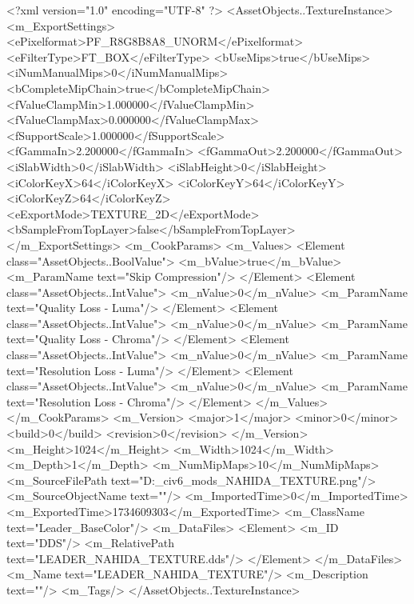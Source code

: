 <?xml version="1.0" encoding="UTF-8" ?>
<AssetObjects..TextureInstance>
	<m_ExportSettings>
		<ePixelformat>PF_R8G8B8A8_UNORM</ePixelformat>
		<eFilterType>FT_BOX</eFilterType>
		<bUseMips>true</bUseMips>
		<iNumManualMips>0</iNumManualMips>
		<bCompleteMipChain>true</bCompleteMipChain>
		<fValueClampMin>1.000000</fValueClampMin>
		<fValueClampMax>0.000000</fValueClampMax>
		<fSupportScale>1.000000</fSupportScale>
		<fGammaIn>2.200000</fGammaIn>
		<fGammaOut>2.200000</fGammaOut>
		<iSlabWidth>0</iSlabWidth>
		<iSlabHeight>0</iSlabHeight>
		<iColorKeyX>64</iColorKeyX>
		<iColorKeyY>64</iColorKeyY>
		<iColorKeyZ>64</iColorKeyZ>
		<eExportMode>TEXTURE_2D</eExportMode>
		<bSampleFromTopLayer>false</bSampleFromTopLayer>
	</m_ExportSettings>
	<m_CookParams>
		<m_Values>
			<Element class="AssetObjects..BoolValue">
				<m_bValue>true</m_bValue>
				<m_ParamName text="Skip Compression"/>
			</Element>
			<Element class="AssetObjects..IntValue">
				<m_nValue>0</m_nValue>
				<m_ParamName text="Quality Loss - Luma"/>
			</Element>
			<Element class="AssetObjects..IntValue">
				<m_nValue>0</m_nValue>
				<m_ParamName text="Quality Loss - Chroma"/>
			</Element>
			<Element class="AssetObjects..IntValue">
				<m_nValue>0</m_nValue>
				<m_ParamName text="Resolution Loss - Luma"/>
			</Element>
			<Element class="AssetObjects..IntValue">
				<m_nValue>0</m_nValue>
				<m_ParamName text="Resolution Loss - Chroma"/>
			</Element>
		</m_Values>
	</m_CookParams>
	<m_Version>
		<major>1</major>
		<minor>0</minor>
		<build>0</build>
		<revision>0</revision>
	</m_Version>
	<m_Height>1024</m_Height>
	<m_Width>1024</m_Width>
	<m_Depth>1</m_Depth>
	<m_NumMipMaps>10</m_NumMipMaps>
	<m_SourceFilePath text="D:\Documents\GitHub\Uzuki_civ6_mods\Mondstadt\Sumeru\LEADER_NAHIDA_TEXTURE.png"/>
	<m_SourceObjectName text=""/>
	<m_ImportedTime>0</m_ImportedTime>
	<m_ExportedTime>1734609303</m_ExportedTime>
	<m_ClassName text="Leader_BaseColor"/>
	<m_DataFiles>
		<Element>
			<m_ID text="DDS"/>
			<m_RelativePath text="LEADER_NAHIDA_TEXTURE.dds"/>
		</Element>
	</m_DataFiles>
	<m_Name text="LEADER_NAHIDA_TEXTURE"/>
	<m_Description text=""/>
	<m_Tags/>
</AssetObjects..TextureInstance>

